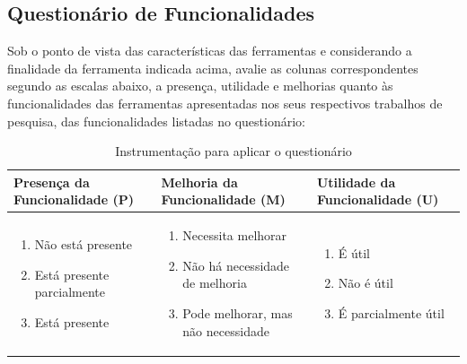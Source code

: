 \subsection{Questionário de Funcionalidades}

Sob o ponto de vista das características das ferramentas e considerando a finalidade da ferramenta indicada acima, avalie as colunas correspondentes segundo as escalas abaixo, a presença, utilidade e melhorias quanto às funcionalidades das ferramentas apresentadas nos seus respectivos trabalhos de pesquisa, das funcionalidades listadas no questionário:

\begin{table}[ht!]
	\centering
	\caption{Instrumentação para aplicar o questionário}
	\label{instrumentacao2}
	\begin{tabular}{|p{5cm}| p{5cm} | p{5cm}|}
		\hline
		Presença da Funcionalidade (P) & Melhoria da Funcionalidade (M) & Utilidade da Funcionalidade (U)\\
		\hline
		\begin{enumerate}
			\item Não está presente
			\item Está presente parcialmente
			\item Está presente
		\end{enumerate} & 
		\begin{enumerate}
			\item Necessita melhorar
			\item Não há necessidade de melhoria
			\item Pode melhorar, mas não necessidade
		\end{enumerate} &
		\begin{enumerate}
			\item É útil
			\item Não é útil
			\item É parcialmente útil
		\end{enumerate}\\
		\hline
		
	\end{tabular}
\end{table}

